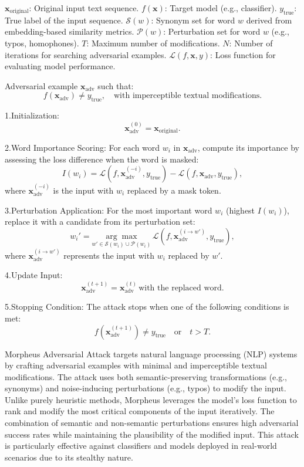 $\mathbf{x}_{\text{original}}$: Original input text sequence.  
$f(\mathbf{x})$: Target model (e.g., classifier).  
$y_{\text{true}}$: True label of the input sequence.  
$\mathcal{S}(w)$: Synonym set for word $w$ derived from embedding-based similarity metrics.  
$\mathcal{P}(w)$: Perturbation set for word $w$ (e.g., typos, homophones).  
$T$: Maximum number of modifications.  
$N$: Number of iterations for searching adversarial examples.  
$\mathcal{L}(f, \mathbf{x}, y)$: Loss function for evaluating model performance.

Adversarial example $\mathbf{x}_{\text{adv}}$ such that:  
\[
f(\mathbf{x}_{\text{adv}}) \neq y_{\text{true}}, \quad \text{with imperceptible textual modifications}.
\]

1.Initialization:  
   \[
   \mathbf{x}_{\text{adv}}^{(0)} = \mathbf{x}_{\text{original}}.
   \]

2.Word Importance Scoring:  
   For each word $w_i$ in $\mathbf{x}_{\text{adv}}$, compute its importance by assessing the loss difference when the word is masked:  
   \[
   I(w_i) = \mathcal{L}(f, \mathbf{x}_{\text{adv}}^{(-i)}, y_{\text{true}}) - \mathcal{L}(f, \mathbf{x}_{\text{adv}}, y_{\text{true}}),
   \]
   where $\mathbf{x}_{\text{adv}}^{(-i)}$ is the input with $w_i$ replaced by a mask token.

3.Perturbation Application:  
   For the most important word $w_i$ (highest $I(w_i)$), replace it with a candidate from its perturbation set:  
   \[
   w_i' = \underset{w' \in \mathcal{S}(w_i) \cup \mathcal{P}(w_i)}{\arg \max} \, \mathcal{L}(f, \mathbf{x}_{\text{adv}}^{(i \rightarrow w')}, y_{\text{true}}),
   \]
   where $\mathbf{x}_{\text{adv}}^{(i \rightarrow w')}$ represents the input with $w_i$ replaced by $w'$.

4.Update Input:  
   \[
   \mathbf{x}_{\text{adv}}^{(t+1)} = \mathbf{x}_{\text{adv}}^{(t)} \, \text{with the replaced word}.
   \]

5.Stopping Condition:  
   The attack stops when one of the following conditions is met:
   \[
   f(\mathbf{x}_{\text{adv}}^{(t+1)}) \neq y_{\text{true}} \quad \text{or} \quad t > T.
   \]

Morpheus Adversarial Attack targets natural language processing (NLP) systems by crafting adversarial examples with minimal and imperceptible textual modifications. The attack uses both semantic-preserving transformations (e.g., synonyms) and noise-inducing perturbations (e.g., typos) to modify the input. Unlike purely heuristic methods, Morpheus leverages the model's loss function to rank and modify the most critical components of the input iteratively. The combination of semantic and non-semantic perturbations ensures high adversarial success rates while maintaining the plausibility of the modified input. This attack is particularly effective against classifiers and models deployed in real-world scenarios due to its stealthy nature.  
